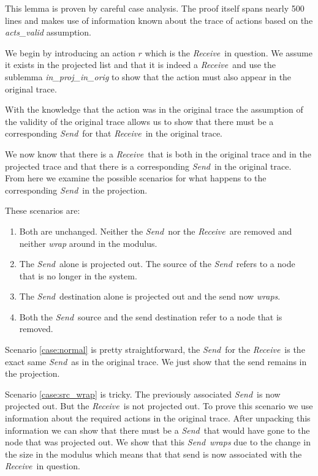 \documentclass[runningheads]{llncs}
\newcommand{\send}{\emph{Send}}
\newcommand{\receive}{\emph{Receive}}
\begin{document}
This lemma is proven by careful case analysis. The proof itself spans nearly 500 lines and makes use of information known about the trace of actions based on the \emph{acts\_valid} assumption. 

We begin by introducing an action $r$ which is the \receive\ in question. We assume it exists in the projected list and that it is indeed a \receive\ and use the sublemma \emph{in\_proj\_in\_orig} to show that the action must also appear in the original trace. 

With the knowledge that the action was in the original trace the assumption of the validity of the original trace allows us to show that there must be a corresponding \send\ for that \receive\ in the original trace. 

We now know that there is a \receive\ that is both in the original trace and in the projected trace and that there is a corresponding \send\ in the original trace. From here we examine the possible scenarios for what happens to the corresponding \send\ in the projection.

These scenarios are:
\begin{enumerate}
\item \label{case:normal} Both are unchanged. Neither the \send\ nor the \receive\ are removed and neither \emph{wrap} around in the modulus.
\item \label{case:src_wrap} The \send\ alone is projected out. The source of the \send\ refers to a node that is no longer in the system.
\item \label{case:dest_wrap} The \send\ destination alone is projected out and the send now \emph{wraps}.
\item \label{case:both_wrap} Both the \send\ source and the send destination refer to a node that is removed. 
\end{enumerate}


Scenario \ref{case:normal} is pretty straightforward, the \send\ for the \receive\ is the exact same \send\ as in the original trace. We just show that the send remains in the projection.

Scenario \ref{case:src_wrap} is tricky. The previously associated \send\ is now projected out. But the \receive\ is not projected out. To prove this scenario we use information about the required actions in the original trace. After unpacking this information we can show that there must be a \send\ that would have gone to the node that was projected out. We show that this \send\ \emph{wraps} due to the change in the size in the modulus which means that that send is now associated with the \receive\ in question.
\end{document}
